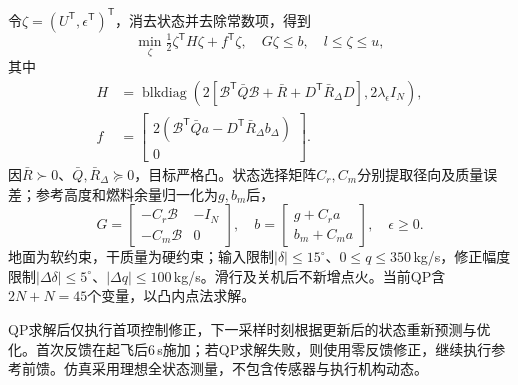 令$\zeta=(U^{\mathsf T},\epsilon^{\mathsf T})^{\mathsf T}$，消去状态并去除常数项，得到
\begin{equation}\min_\zeta\tfrac12\zeta^{\mathsf T}H\zeta+f^{\mathsf T}\zeta,\quad G\zeta\le b,\quad l\le\zeta\le u,\end{equation}
其中
\begin{equation}
\begin{aligned}
H&=\operatorname{blkdiag}\left(2[\mathcal B^{\mathsf T}\bar Q\mathcal B+\bar R+D^{\mathsf T}\bar R_\Delta D],2\lambda_\epsilon I_N\right),\\
f&=\begin{bmatrix}2(\mathcal B^{\mathsf T}\bar Q a-D^{\mathsf T}\bar R_\Delta b_\Delta)\\0\end{bmatrix}.
\end{aligned}
\end{equation}
因$\bar R\succ0$、$\bar Q,\bar R_\Delta\succeq0$，目标严格凸\cite{boyd2004}。状态选择矩阵$C_r,C_m$分别提取径向及质量误差；参考高度和燃料余量归一化为$g,b_m$后，
\begin{equation}
G=\begin{bmatrix}-C_r\mathcal B&-I_N\\-C_m\mathcal B&0\end{bmatrix},\quad
b=\begin{bmatrix}g+C_ra\\b_m+C_ma\end{bmatrix},\quad\epsilon\ge0.
\end{equation}
地面为软约束，干质量为硬约束；输入限制$|\delta|\le15^\circ$、$0\le q\le350$\,kg/s，修正幅度限制$|\Delta\delta|\le5^\circ$、$|\Delta q|\le100$\,kg/s。滑行及关机后不新增点火。当前QP含$2N+N=45$个变量，以凸内点法求解。

QP求解后仅执行首项控制修正，下一采样时刻根据更新后的状态重新预测与优化。首次反馈在起飞后6\,s施加；若QP求解失败，则使用零反馈修正，继续执行参考前馈。仿真采用理想全状态测量，不包含传感器与执行机构动态。
